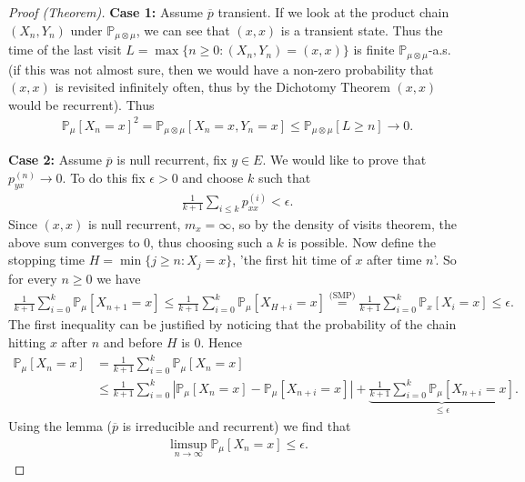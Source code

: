 \begin{proof}[Proof (Theorem)]
	\textbf{Case 1:} Assume $\overline{p}$ transient. If we look at the product chain $(X_n, Y_n)$ under $\mathbb{P}_{\mu \otimes \mu}$, we can see that $(x,x)$ is a transient state. Thus the time of the last visit  $L = \max\{n\geq 0: (X_n, Y_n) = (x,x) \}$ is finite $\mathbb{P}_{\mu \otimes \mu}$-a.s. (if this was not almost sure, then we would have a non-zero probability that $(x,x)$ is revisited infinitely often, thus by the Dichotomy Theorem $(x,x)$ would be recurrent). Thus
\begin{align}
	\mathbb{P}_{\mu } \left[ X_n = x \right]^2 = \mathbb{P}_{\mu \otimes \mu} \left[ X_n =x, Y_n=x \right] \leq \mathbb{P}_{\mu \otimes \mu } \left[ L \geq n \right] \to 0.
\end{align}

\textbf{Case 2:} Assume $\overline{p}$ is null recurrent, fix  $y \in E$. We would like to prove that $p_{yx}^{(n)} \to 0$. To do this fix $\epsilon > 0$ and choose $k$ such that
\begin{align}
	\frac{1}{k+1} \sum_{i\leq k}^{} p_{xx}^{(i)} < \epsilon.
\end{align}
Since $(x,x)$ is null recurrent, $m_x= \infty$, so by the density of visits theorem, the above sum converges to $0$, thus choosing such a $k$ is possible. Now define the stopping time $H = \min\{j \geq n: X_j = x\}$, 'the first hit time of $x$ after time $n$'. So for every $n\geq 0$ we have
\begin{align}
	\frac{1}{k+1} \sum_{i=0}^{k} \mathbb{P}_{\mu } \left[ X_{n+1}=x \right]  \leq \frac{1}{k+1} \sum_{i=0}^{k} \mathbb{P}_{\mu } \left[ X_{H+i}=x \right]  
	\stackrel{\textrm{(SMP)}}{=} \frac{1}{k+1} \sum_{i=0}^{k} \mathbb{P}_{x} \left[ X_i =x \right]  \leq \epsilon.
\end{align}
The first inequality can be justified by noticing that the probability of the chain hitting $x$ after $n$ and before $ H$ is 0. Hence
\begin{align}
	\mathbb{P}_{\mu } \left[ X_n = x \right] &= \frac{1}{k+1} \sum_{i=0}^{k} \mathbb{P}_{\mu } \left[ X_n = x \right] \\
	&\leq \frac{1}{k+1}\sum_{i=0}^{k} \left| \mathbb{P}_{\mu } \left[ X_n = x \right] - \mathbb{P}_{\mu } \left[ X_{n+i} = x \right] \right| + \underbrace{\frac{1}{k+1} \sum_{i=0}^{k} \mathbb{P}_{\mu } \left[ X_{n+i}=x \right]}_{\leq \epsilon} 
.\end{align}
Using the lemma ($\overline{p}$ is irreducible and recurrent) we find that
\begin{align}
	\limsup_{n\to\infty} \mathbb{P}_{\mu } \left[ X_n = x \right] \leq \epsilon.
\end{align}


	
\end{proof}


